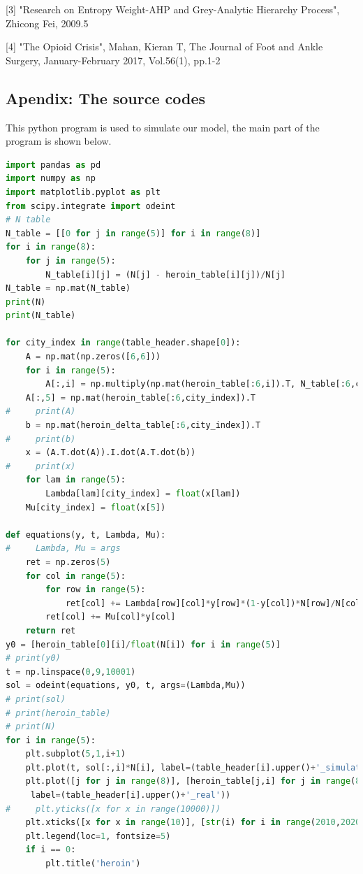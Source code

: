 \documentclass[12pt]{article}
\begin{document}
[3] "Research on Entropy Weight-AHP and Grey-Analytic Hierarchy Process", Zhicong Fei, 2009.5

[4] "The Opioid Crisis", Mahan, Kieran T, The Journal of Foot and Ankle Surgery, January-February 2017, Vol.56(1), pp.1-2 

\clearpage
\begin{subappendices}						%
\section*{Apendix: The source codes}		%

This python program is used to simulate our model, the main part of the program is shown below.
\begin{lstlisting}[language=python, caption=\texttt{modeling.py}]
import pandas as pd
import numpy as np
import matplotlib.pyplot as plt
from scipy.integrate import odeint
# N table
N_table = [[0 for j in range(5)] for i in range(8)]
for i in range(8): 
    for j in range(5):
        N_table[i][j] = (N[j] - heroin_table[i][j])/N[j]
N_table = np.mat(N_table)
print(N)
print(N_table)

for city_index in range(table_header.shape[0]):
    A = np.mat(np.zeros([6,6]))
    for i in range(5):
        A[:,i] = np.multiply(np.mat(heroin_table[:6,i]).T, N_table[:6,city_index])
    A[:,5] = np.mat(heroin_table[:6,city_index]).T
#     print(A)
    b = np.mat(heroin_delta_table[:6,city_index]).T
#     print(b)
    x = (A.T.dot(A)).I.dot(A.T.dot(b))
#     print(x)
    for lam in range(5):
        Lambda[lam][city_index] = float(x[lam])
    Mu[city_index] = float(x[5])
    
def equations(y, t, Lambda, Mu):
#     Lambda, Mu = args
    ret = np.zeros(5)
    for col in range(5):
        for row in range(5):
            ret[col] += Lambda[row][col]*y[row]*(1-y[col])*N[row]/N[col]
        ret[col] += Mu[col]*y[col]
    return ret
y0 = [heroin_table[0][i]/float(N[i]) for i in range(5)]
# print(y0)
t = np.linspace(0,9,10001)
sol = odeint(equations, y0, t, args=(Lambda,Mu))
# print(sol)
# print(heroin_table)
# print(N)
for i in range(5):
    plt.subplot(5,1,i+1)
    plt.plot(t, sol[:,i]*N[i], label=(table_header[i].upper()+'_simulated'))
    plt.plot([j for j in range(8)], [heroin_table[j,i] for j in range(8)],\
     label=(table_header[i].upper()+'_real'))
#     plt.yticks([x for x in range(10000)])
    plt.xticks([x for x in range(10)], [str(i) for i in range(2010,2020)])
    plt.legend(loc=1, fontsize=5)
    if i == 0:
        plt.title('heroin')
\end{lstlisting}




\end{subappendices}
\end{document}
